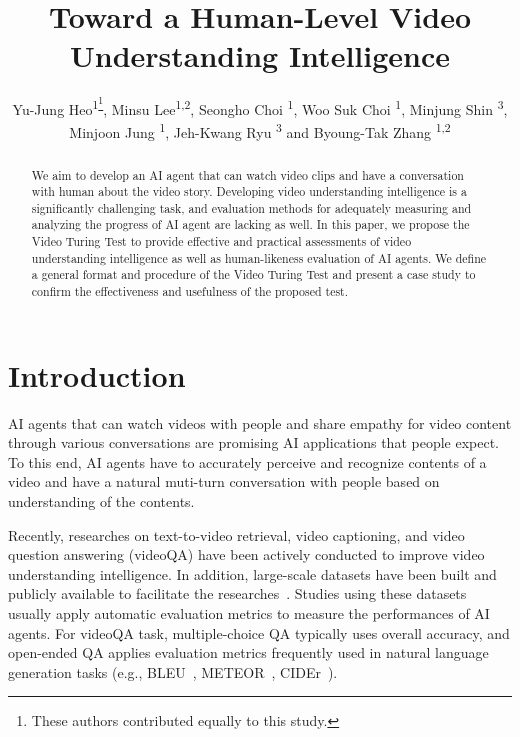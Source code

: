 \documentclass[letterpaper]{article} %
\title{Toward a Human-Level Video Understanding Intelligence}
\author {
    Yu-Jung Heo\textsuperscript{\rm 1\thanks{These authors contributed equally to this study.}},
    Minsu Lee\textsuperscript{\rm 1,2\footnotemark[1]},
    Seongho Choi \textsuperscript{\rm 1},
    Woo Suk Choi \textsuperscript{\rm 1},
    Minjung Shin \textsuperscript{\rm 3},
    Minjoon Jung \textsuperscript{\rm 1},
    Jeh-Kwang Ryu \textsuperscript{\rm 3} and
    Byoung-Tak Zhang \textsuperscript{\rm 1,2}\\
}
\begin{document}
\maketitle

\begin{abstract}
We aim to develop an AI agent that can watch video clips and have a conversation with human about the video story. Developing video understanding intelligence is a significantly challenging task, and evaluation methods for adequately measuring and analyzing the progress of AI agent are lacking as well.
In this paper, we propose the Video Turing Test to provide effective and practical assessments of video understanding intelligence as well as human-likeness evaluation of AI agents. We define a general format and procedure of the Video Turing Test and present a case study to confirm the effectiveness and usefulness of the proposed test.
\end{abstract}

\section{Introduction} %
AI agents that can watch videos with people and share empathy for video content through various conversations are promising AI applications that people expect. To this end, AI agents have to accurately perceive and recognize contents of a video and have a natural muti-turn conversation with people based on understanding of the contents.

Recently, researches on text-to-video retrieval, video captioning, and video question answering (videoQA) have been actively conducted to improve video understanding intelligence. In addition, large-scale datasets have been built and publicly available to facilitate the researches~\cite{alamri2019audio,lei2018tvqa,lei2020tvr,choi2021dramaqa}. Studies using these datasets usually apply automatic evaluation metrics to measure the performances of AI agents.
For videoQA task, multiple-choice QA typically uses overall accuracy, and open-ended QA applies evaluation metrics frequently used in natural language generation tasks (e.g., BLEU~\cite{papineni2002bleu}, METEOR~\cite{banerjee2005meteor}, CIDEr~\cite{vedantam2015cider}).
\end{document}

